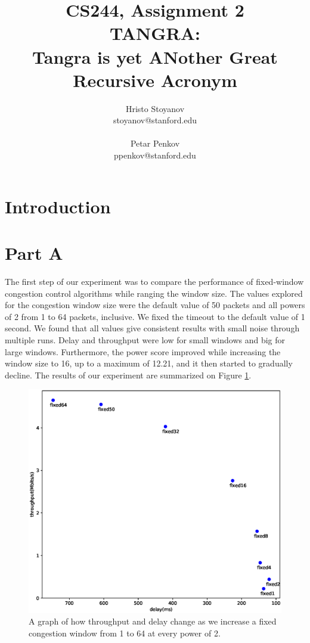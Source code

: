 \documentclass[12pt]{article}
\begin{document}
 
\title{CS244, Assignment 2\\TANGRA:\\ Tangra is yet ANother Great Recursive
Acronym}
\author{Hristo Stoyanov\\
stoyanov@stanford.edu\\
\\
Petar Penkov\\
ppenkov@stanford.edu}
 
\maketitle

\section*{Introduction}

\section*{Part A}

The first step of our experiment was to compare the performance of fixed-window
congestion control algorithms while ranging the window size. The values explored
for the congestion window size were the default value of 50 packets and all
powers of 2 from 1 to 64 packets, inclusive. We fixed the timeout to the default
value of 1 second. We found that all values give consistent results with small
noise through multiple runs. Delay and throughput were low for small windows and
big for large windows. Furthermore, the power score improved while increasing
the window size to 16, up to a maximum of 12.21, and it then started to
gradually decline. The results of our experiment are summarized on Figure
\ref{fig:fixed}.

\begin{figure}[h]
 \includegraphics[width=\textwidth,height=\textheight,keepaspectratio]{figure_fixed.eps}
 \caption{A graph of how throughput and delay change as we increase a fixed
 congestion window from 1 to 64 at every power of 2.}
 \label{fig:fixed}
\end{figure}
\end{document}
